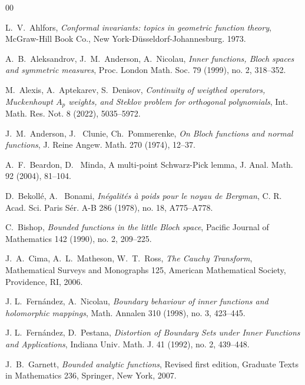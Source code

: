\documentclass[a4paper,12pt]{article}
\theoremstyle{definition}
\numberwithin{equation}{section}
\begin{document}

\begin{thebibliography}{00}

 L.~V.~Ahlfors, {\em  Conformal invariants: topics in geometric function
theory}\/, McGraw-Hill Book Co., New York-D\"usseldorf-Johannesburg.
1973.

 A.~B.~Aleksandrov, J.~M.~Anderson, A.~Nicolau, {\em Inner functions, Bloch spaces and symmetric measures}\/, Proc. London Math. Soc. 79 (1999), no. 2, 318--352.

 M.~Alexis, A.~Aptekarev, S.~Denisov, {\em Continuity of weigthed operators, Muckenhoupt $A_p$ weights, and Steklov problem for orthogonal polynomials}\/, Int. Math. Res. Not. 8 (2022), 5035--5972.

 J.~M.~Anderson, J.~ Clunie, Ch.~Pommerenke, {\em On Bloch functions and normal functions}\/, J. Reine Angew. Math. 270 (1974), 12--37.

 A.~F.~Beardon, D.~ Minda, {A multi-point Schwarz-Pick lemma}\/, J. Anal. Math. 92 (2004), 81--104.

 D.~Bekoll\'e, A.~ Bonami, {\em In\'egalit\'es \`a poids pour le noyau de Bergman}\/,  C. R. Acad. Sci. Paris S\'er. A-B 286 (1978), no. 18, A775--A778. 

 C.~Bishop, {\em Bounded functions in the little Bloch space}\/, Pacific Journal of Mathematics 142 (1990), no. 2, 209--225.

 J.~A.~Cima, A.~L.~Matheson, W.~T.~Ross, {\em The Cauchy Transform}\/, Mathematical Surveys and Monographs 125, American Mathematical Society, Providence, RI, 2006.

 J. L.~Fern\'andez, A.~Nicolau, {\em Boundary behaviour of inner functions and holomorphic mappings}\/, Math. Annalen 310 (1998), no. 3, 423--445.  

 J. L.~Fern\'andez, D.~Pestana, {\em Distortion of Boundary Sets under Inner Functions and Applications}\/, Indiana Univ. Math. J. 41 (1992), no. 2, 439--448.

 J.~B.~Garnett, {\em Bounded analytic functions}\/, Revised first edition, Graduate
Texts in Mathematics 236, Springer, New York, 2007.



\end{thebibliography}
\end{document}
